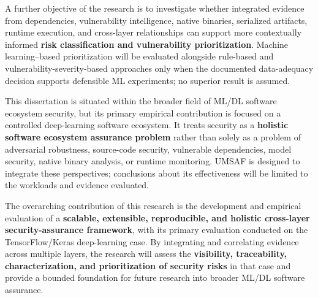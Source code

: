 \documentclass[
  12pt,
  letterpaper,
  oneside]{report}
\begin{document}
A further objective of the research is to investigate whether integrated
evidence from dependencies, vulnerability intelligence, native binaries,
serialized artifacts, runtime execution, and cross-layer relationships
can support more contextually informed \textbf{risk classification and
vulnerability prioritization}. Machine learning--based prioritization
will be evaluated alongside rule-based and vulnerability-severity-based
approaches only when the documented data-adequacy decision supports
defensible ML experiments; no superior result is assumed.

This dissertation is situated within the broader field of ML/DL software
ecosystem security, but its primary empirical contribution is focused on
a controlled deep-learning software ecosystem. It treats security as a
\textbf{holistic software ecosystem assurance problem} rather than
solely as a problem of adversarial robustness, source-code security,
vulnerable dependencies, model security, native binary analysis, or
runtime monitoring. UMSAF is designed to integrate these perspectives;
conclusions about its effectiveness will be limited to the workloads and
evidence evaluated.

The overarching contribution of this research is the development and
empirical evaluation of a \textbf{scalable, extensible, reproducible,
and holistic cross-layer security-assurance framework}, with its primary
evaluation conducted on the TensorFlow/Keras deep-learning case. By
integrating and correlating evidence across multiple layers, the
research will assess the \textbf{visibility, traceability,
characterization, and prioritization of security risks} in that case and
provide a bounded foundation for future research into broader ML/DL
software assurance.

\clearpage
{}
{}
\printbibliography[title={Bibliography}]
\end{document}
